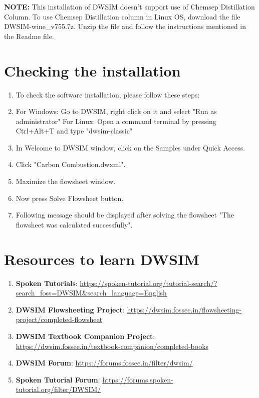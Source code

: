 \documentclass[a4paper,12pt]{article}
\begin{document}
\noindent \textbf{NOTE:} This installation of DWSIM doesn't support use of Chemsep Distillation Column. To use Chemsep Distillation column in Linux OS, download the file DWSIM-wine\_v755.7z. Unzip the file and follow the instructions mentioned in the Readme file.

\section{Checking the installation}

\begin{enumerate}

\item To check the software installation, please follow these steps:
\item For Windows: Go to DWSIM, right click on it and select "Run as administrator"
\newline For Linux: Open a command terminal by pressing Ctrl+Alt+T and type "dwsim-classic"
\item In Welcome to DWSIM window, click on the Samples under Quick Access.
\item Click "Carbon Combustion.dwxml".
\item Maximize the flowsheet window.
\item Now press Solve Flowsheet button.
\item Following message should be displayed after solving the flowsheet "The flowsheet was calculated successfully".

\end{enumerate}
\section{Resources to learn DWSIM}

\begin{enumerate}

\item \textbf{Spoken Tutorials}: \url{https://spoken-tutorial.org/tutorial-search/?search_foss=DWSIM&search_language=English}
\item \textbf{DWSIM Flowsheeting Project}: \url{https://dwsim.fossee.in/flowsheeting-project/completed-flowsheet}
\item \textbf{DWSIM Textbook Companion Project}: \url{https://dwsim.fossee.in/textbook-companion/completed-books}
\item \textbf{DWSIM Forum}: \url{https://forums.fossee.in/filter/dwsim/}
\item \textbf{Spoken Tutorial Forum}: \url{https://forums.spoken-tutorial.org/filter/DWSIM/}
\end{enumerate}
\end{document}
